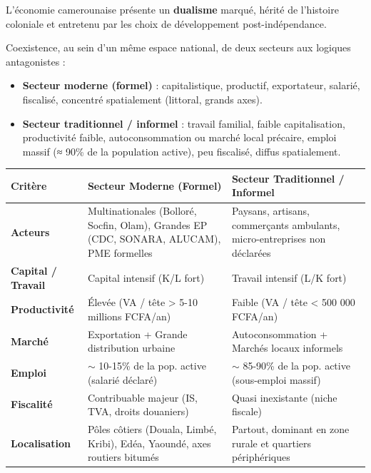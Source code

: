 \documentclass[11pt]{article}
\begin{document}
L'économie camerounaise présente un \textbf{dualisme} marqué, hérité de l'histoire coloniale et entretenu par les choix de développement post-indépendance.

\begin{definition}
Coexistence, au sein d'un même espace national, de deux secteurs aux logiques antagonistes :
\begin{itemize}
    \item \textbf{Secteur moderne (formel)} : capitalistique, productif, exportateur, salarié, fiscalisé, concentré spatialement (littoral, grands axes).
    \item \textbf{Secteur traditionnel / informel} : travail familial, faible capitalisation, productivité faible, autoconsommation ou marché local précaire, emploi massif (≈ 90\% de la population active), peu fiscalisé, diffus spatialement.
\end{itemize}
\end{definition}

\begin{center}
\begin{tabularx}{\linewidth}{|l|X|X|}
\hline
\rowcolor{popblueL} \textbf{Critère} & \textbf{Secteur Moderne (Formel)} & \textbf{Secteur Traditionnel / Informel} \\ \hline
\textbf{Acteurs} & Multinationales (Bolloré, Socfin, Olam), Grandes EP (CDC, SONARA, ALUCAM), PME formelles & Paysans, artisans, commerçants ambulants, micro-entreprises non déclarées \\ \hline
\textbf{Capital / Travail} & Capital intensif (K/L fort) & Travail intensif (L/K fort) \\ \hline
\textbf{Productivité} & Élevée (VA / tête > 5-10 millions FCFA/an) & Faible (VA / tête < 500 000 FCFA/an) \\ \hline
\textbf{Marché} & Exportation + Grande distribution urbaine & Autoconsommation + Marchés locaux informels \\ \hline
\textbf{Emploi} & $\sim$ 10-15\% de la pop. active (salarié déclaré) & $\sim$ 85-90\% de la pop. active (sous-emploi massif) \\ \hline
\textbf{Fiscalité} & Contribuable majeur (IS, TVA, droits douaniers) & Quasi inexistante (niche fiscale) \\ \hline
\textbf{Localisation} & Pôles côtiers (Douala, Limbé, Kribi), Edéa, Yaoundé, axes routiers bitumés & Partout, dominant en zone rurale et quartiers périphériques \\ \hline
\end{tabularx}
\end{center}
\end{document}
